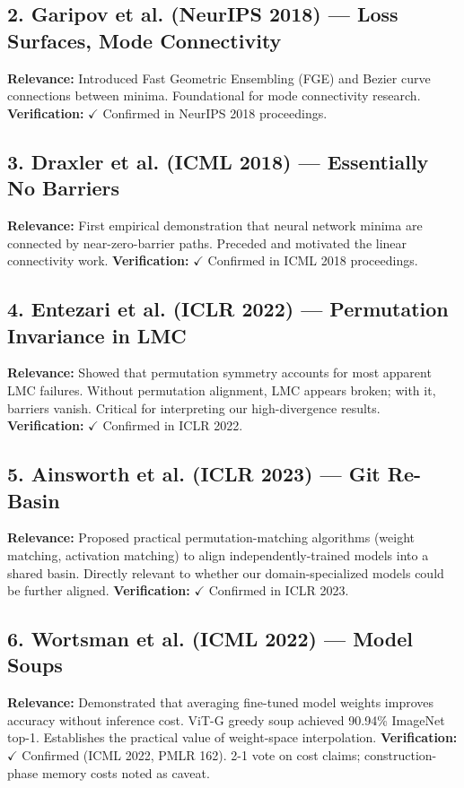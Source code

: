 \documentclass[11pt,a4paper]{article}
\begin{document}
\subsection*{2. Garipov et al. (NeurIPS 2018) --- Loss Surfaces, Mode Connectivity}
\textbf{Relevance:} Introduced Fast Geometric Ensembling (FGE) and Bezier curve connections between minima. Foundational for mode connectivity research. \textbf{Verification:} $\checkmark$ Confirmed in NeurIPS 2018 proceedings.

\subsection*{3. Draxler et al. (ICML 2018) --- Essentially No Barriers}
\textbf{Relevance:} First empirical demonstration that neural network minima are connected by near-zero-barrier paths. Preceded and motivated the linear connectivity work. \textbf{Verification:} $\checkmark$ Confirmed in ICML 2018 proceedings.

\subsection*{4. Entezari et al. (ICLR 2022) --- Permutation Invariance in LMC}
\textbf{Relevance:} Showed that permutation symmetry accounts for most apparent LMC failures. Without permutation alignment, LMC appears broken; with it, barriers vanish. Critical for interpreting our high-divergence results. \textbf{Verification:} $\checkmark$ Confirmed in ICLR 2022.

\subsection*{5. Ainsworth et al. (ICLR 2023) --- Git Re-Basin}
\textbf{Relevance:} Proposed practical permutation-matching algorithms (weight matching, activation matching) to align independently-trained models into a shared basin. Directly relevant to whether our domain-specialized models could be further aligned. \textbf{Verification:} $\checkmark$ Confirmed in ICLR 2023.

\subsection*{6. Wortsman et al. (ICML 2022) --- Model Soups}
\textbf{Relevance:} Demonstrated that averaging fine-tuned model weights improves accuracy without inference cost. ViT-G greedy soup achieved 90.94\% ImageNet top-1. Establishes the practical value of weight-space interpolation. \textbf{Verification:} $\checkmark$ Confirmed (ICML 2022, PMLR 162). 2-1 vote on cost claims; construction-phase memory costs noted as caveat.
\end{document}
